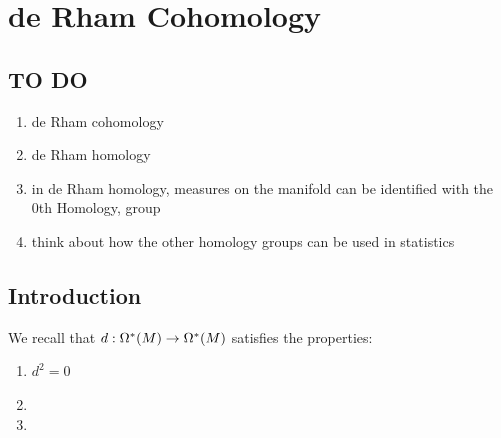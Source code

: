\documentclass{book}
\begin{document}
\newpage
\chapter{de Rham Cohomology}


\section{TO DO}
\begin{enumerate}
	\item de Rham cohomology
	\item de Rham homology
	\item in de Rham homology, measures on the manifold can be identified with the 0th Homology, group
	\item think about how the other homology groups can be used in statistics
\end{enumerate}


\section{Introduction}

\begin{note}
	We recall that $d: \Omega^*(M) \rightarrow \Omega^*(M)$ satisfies the properties:
	\begin{enumerate}
		\item $d^2 = 0$
		\item 
		\item 
	\end{enumerate}
\end{note}
\end{document}
